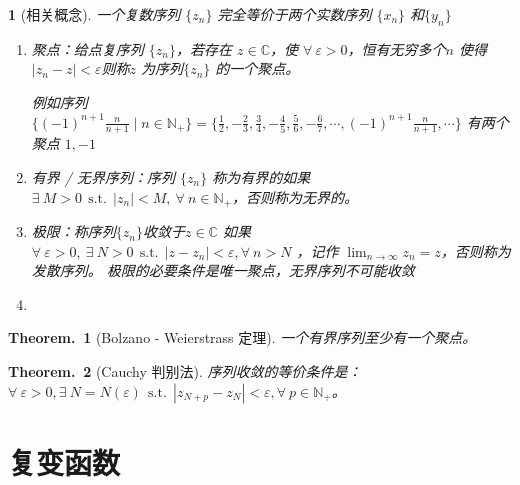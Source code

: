 \documentclass[zihao=5,UTF8]{report}
\def\C{\mathbb{C}}
\theoremstyle{MyLineTheoremStyle} %
\newtheorem{LineTheorem}{Theorem.\,}
\theoremstyle{MyBlockTheoremStyle} %
\theoremstyle{MySubsubsectionStyle} %
\newtheorem{definition}{}
\begin{document}
\begin{definition}[相关概念]
    一个复数序列 $\{z_n\}$ 完全等价于两个实数序列 $\{x_n\}$ 和$\{y_n\}$
    \begin{enumerate}
        \item 聚点：给点复序列 $\{z_n\}$，若存在 $z \in \C$，使 $\forall\ \varepsilon >0$，恒有无穷多个$n$ 使得 $| z_n - z | < \varepsilon$则称$z$ 为序列$\{z_n\}$ 的一个聚点。
        {\par\color{gray}\small
        例如序列 $\{(-1)^{n+1}\frac n{n+1}\mid n \in \mathbb{N}_+\} =  \{\frac12,-\frac23,\frac34,-\frac45,\frac56,-\frac67,\cdots,(-1)^{n+1}\frac n{n+1},\cdots \}$ 有两个聚点 $1,-1$
        \par}
        \item 有界 / 无界序列：序列 $\{z_n\}$ 称为有界的如果 $\exists\ M>0 \ \ \text{s.t.}\ \ | z_n | < M,\ \forall\ n \in \mathbb{N}_+$，否则称为无界的。
        \item 极限：称序列$\{z_n\}$收敛于$z \in \C$ 如果 $ \forall\ \varepsilon > 0,\ \exists\ N>0 \ \ \text{s.t.}\ \ | z - z_n | < \varepsilon, \forall\ n > N$ ，记作 $\displaystyle \lim_{n \rightarrow \infty} z_n = z $，否则称为发散序列。
        极限的必要条件是唯一聚点，无界序列不可能收敛
        \item 
    \end{enumerate}
\end{definition}

\begin{LineTheorem}[Bolzano - Weierstrass 定理]\label{Bolzano - Weierstrass 定理}
一个有界序列至少有一个聚点。
\end{LineTheorem}

\begin{LineTheorem}[Cauchy 判别法]\label{Cauchy 判别法}
序列收敛的等价条件是：$\forall\ \varepsilon > 0, \exists\ N = N(\varepsilon) \ \ \text{s.t.}\ \ | z_{N+p} - z_N | < \varepsilon, \forall\ p \in \mathbb{N}_+$。
\end{LineTheorem}

\section{复变函数}
\end{document}
